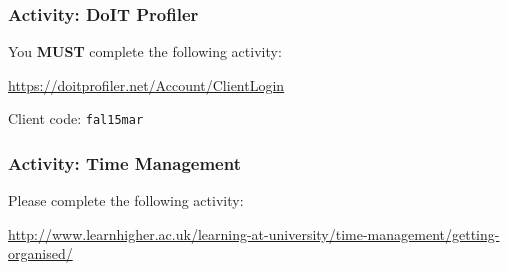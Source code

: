 \begin{frame}
	\frametitle{Activity: DoIT Profiler}
	
	You \textbf{MUST} complete the following activity:
	
	\vspace{2em}
	
	\url{https://doitprofiler.net/Account/ClientLogin}
	
	\vspace{2em}
	
	Client code: \texttt{fal15mar}

\end{frame}

\begin{frame}
	\frametitle{Activity: Time Management}
	
	Please complete the following activity:
	
	\vspace{2em}
	
	\url{http://www.learnhigher.ac.uk/learning-at-university/time-management/getting-organised/}

\end{frame}


